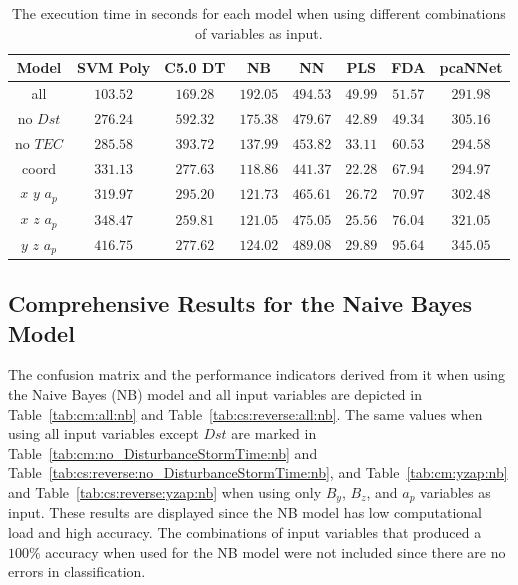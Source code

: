 \documentclass[sn-mathphys-num]{sn-jnl}%
\begin{document}
\begin{table}[!ht]
    \centering
    \caption{The execution time in seconds for each model when using different combinations of variables as input.}
	\label{tab:time:total}
	\begin{tabular}{|c|c|c|c|c|c|c|c|}
		\hline
		Model & SVM Poly & C5.0 DT & NB & NN & PLS & FDA & pcaNNet \\ \hline
		all & $103.52$ & $169.28$ & $192.05$ & $494.53$ & $49.99$ & $51.57$ & $291.98$ \\ \hline
		no $Dst$ & $276.24$ & $592.32$ & $175.38$ & $479.67$ & $42.89$ & $49.34$ & $305.16$ \\ \hline
		no $TEC$ & $285.58$ & $393.72$ & $137.99$ & $453.82$ & $33.11$ & $60.53$ & $294.58$ \\ \hline
		coord & $331.13$ & $277.63$ & $118.86$ & $441.37$ & $22.28$ & $67.94$ & $294.97$ \\ \hline
		$x$ $y$ $a_{p}$ & $319.97$ & $295.20$ & $121.73$ & $465.61$ & $26.72$ & $70.97$ & $302.48$ \\ \hline
		$x$ $z$ $a_{p}$ & $348.47$ & $259.81$ & $121.05$ & $475.05$ & $25.56$ & $76.04$ & $321.05$ \\ \hline
		$y$ $z$ $a_{p}$ & $416.75$ & $277.62$ & $124.02$ & $489.08$ & $29.89$ & $95.64$ & $345.05$ \\ \hline
	\end{tabular}
\end{table}

\subsection{Comprehensive Results for the Naive Bayes Model}

The confusion matrix and the performance indicators derived from it when using the Naive Bayes (NB) model and all input variables are depicted in Table~\ref{tab:cm:all:nb} and Table~\ref{tab:cs:reverse:all:nb}. The same values when using all input variables except $Dst$ are marked in Table~\ref{tab:cm:no_DisturbanceStormTime:nb} and Table~\ref{tab:cs:reverse:no_DisturbanceStormTime:nb}, and Table~\ref{tab:cm:yzap:nb} and Table~\ref{tab:cs:reverse:yzap:nb} when using only $B_{y}$, $B_{z}$, and $a_{p}$ variables as input. These results are displayed since the NB model has low computational load and high accuracy. The combinations of input variables that produced a $100\%$ accuracy when used for the NB model were not included since there are no errors in classification.
\end{document}
